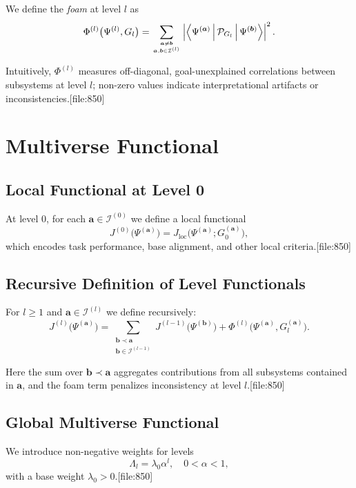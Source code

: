 \documentclass[12pt]{article}
\begin{document}
We define the \emph{foam} at level $l$ as
\[
\Phi^{(l)}\big(\Psi^{(l)}, G_l\big) =
\sum_{\bm{a} \neq \bm{b} \atop \bm{a},\bm{b} \in \mathcal{I}^{(l)}}
\left|
  \left\langle
    \Psi^{(\bm{a})}
    \,\middle|\,
    \mathcal{P}_{G_l}
    \,\middle|\,
    \Psi^{(\bm{b})}
  \right\rangle
\right|^2.
\]

Intuitively, $\Phi^{(l)}$ measures off-diagonal, goal-unexplained correlations
between subsystems at level $l$; non-zero values indicate interpretational
artifacts or inconsistencies.[file:850]

\section{Multiverse Functional}

\subsection{Local Functional at Level 0}

At level $0$, for each $\bm{a} \in \mathcal{I}^{(0)}$ we define a local
functional
\[
J^{(0)}\big(\Psi^{(\bm{a})}\big)
=
J_{\text{loc}}\big(\Psi^{(\bm{a})}; G_0^{(\bm{a})}\big),
\]
which encodes task performance, base alignment, and other local criteria.[file:850]

\subsection{Recursive Definition of Level Functionals}

For $l \ge 1$ and $\bm{a} \in \mathcal{I}^{(l)}$ we define recursively:
\[
J^{(l)}\big(\Psi^{(\bm{a})}\big)
=
\sum_{\substack{\bm{b} \prec \bm{a} \\
                \bm{b} \in \mathcal{I}^{(l-1)}}}
J^{(l-1)}\big(\Psi^{(\bm{b})}\big)
+
\Phi^{(l)}\big(\Psi^{(\bm{a})}, G_l^{(\bm{a})}\big).
\]

Here the sum over $\bm{b} \prec \bm{a}$ aggregates contributions from all
subsystems contained in $\bm{a}$, and the foam term penalizes inconsistency
at level $l$.[file:850]

\subsection{Global Multiverse Functional}

We introduce non-negative weights for levels
\[
\Lambda_l = \lambda_0 \alpha^l,
\quad 0 < \alpha < 1,
\]
with a base weight $\lambda_0 > 0$.[file:850]
\end{document}
